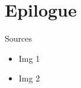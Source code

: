     \section{Epilogue}

    \begin{frame}[t,fragile]{Sources}
        \begin{itemize}
            \item Img 1
            \item Img 2
        \end{itemize}
    \end{frame}



